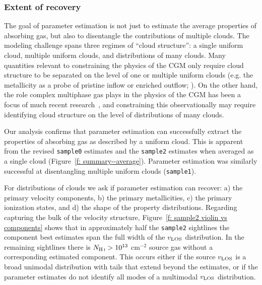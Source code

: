 \documentclass[fleqn,usenatbib]{mnras}
\begin{document}
\subsubsection{Extent of recovery}

The goal of parameter estimation is not just to estimate the average properties of absorbing gas,
but also to disentangle the contributions of multiple clouds.
The modeling challenge spans three regimes of ``cloud structure'':
a single uniform cloud,
multiple uniform clouds,
and distributions of many clouds.
Many quantities relevant to constraining the physics of the CGM only require cloud structure to be separated on the level of one or multiple uniform clouds (e.g. the metallicity as a probe of pristine inflow or enriched outflow; \citealt{hafen2017Lowredshift}).
On the other hand, the role complex multiphase gas plays in the physics of the CGM has been a focus of much recent research~\citep[e.g.][]{voit2015Precipitationregulated, esmerian2021Thermal, smith2023Arkenstone, tan2023Cloudy},
and constraining this observationally may require identifying cloud structure on the level of distributions of many clouds.

Our analysis confirms that parameter estimation can successfully extract the properties of absorbing gas as described by a uniform cloud.
This is apparent from the revised \texttt{sample0} estimates and the \texttt{sample2} estimates when averaged as a single cloud (Figure~\ref{f: summary--average}).
Parameter estimation was similarly successful at disentangling multiple uniform clouds (\texttt{sample1}).

For distributions of clouds we ask if parameter estimation can recover:
a) the primary velocity components,
b) the primary metallicities,
c) the primary ionization states, and
d) the shape of the property distributions.
Regarding capturing the bulk of the velocity structure, Figure~\ref{f: sample2 violin vs components} shows that in approximately half the \texttt{sample2} sightlines the component best estimates span the full width of the $v_{\rm LOS}$ distribution.
In the remaining sightlines there is $N_{\ion{H}{I}}>10^{13}$ cm$^{-2}$ source gas without a corresponding estimated component.
This occurs either if the source $v_{\rm LOS}$ is a broad unimodal distribution with tails that extend beyond the estimates,
or if the parameter estimates do not identify all modes of a multimodal $v_{\rm LOS}$ distribution.
\end{document}
